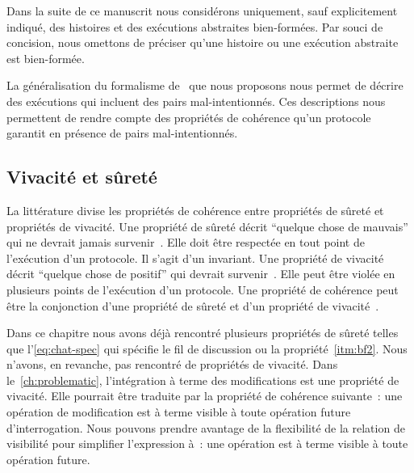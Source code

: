 \begin{remark}
Dans la suite de ce manuscrit nous considérons uniquement, sauf explicitement indiqué, des histoires et des exécutions abstraites bien-formées.
Par souci de concision, nous omettons de préciser qu'une histoire ou une exécution abstraite est bien-formée.
\end{remark}


La généralisation du formalisme de~\textcite{burckhardt_eventualconsistency_2014} que nous proposons nous permet de décrire des exécutions qui incluent des pairs mal-intentionnés.
Ces descriptions nous permettent de rendre compte des propriétés de cohérence qu'un protocole garantit en présence de pairs mal-intentionnés.



\subsection{Vivacité et sûreté}\label{subsec:consistency-spec-liveness-safety}

La littérature divise les propriétés de cohérence entre propriétés de sûreté et propriétés de vivacité.
Une propriété de sûreté décrit \enquote{quelque chose de mauvais} qui ne devrait jamais survenir~\autocite{lamport_1977_correctness}.
Elle doit être respectée en tout point de l'exécution d'un protocole.
Il s'agit d'un invariant.
Une propriété de vivacité décrit \enquote{quelque chose de positif} qui devrait survenir~\autocite{lamport_1977_correctness}.
Elle peut être violée en plusieurs points de l'exécution d'un protocole.
Une propriété de cohérence peut être la conjonction d'une propriété de sûreté et d'un propriété de vivacité~\autocite{alpern_liveness_1985}.

Dans ce chapitre nous avons déjà rencontré plusieurs propriétés de sûreté telles que l'\autoref{eq:chat-spec} qui spécifie le fil de discussion ou la propriété~\ref{itm:bf2}.
Nous n'avons, en revanche, pas rencontré de propriétés de vivacité.
Dans le~\autoref{ch:problematic}, l'intégration à terme des modifications est une propriété de vivacité.
Elle pourrait être traduite par la propriété de cohérence suivante~: une opération de modification est à terme visible à toute opération future d'interrogation.
Nous pouvons prendre avantage de la flexibilité de la relation de visibilité pour simplifier l'expression à~: une opération est à terme visible à toute opération future.



